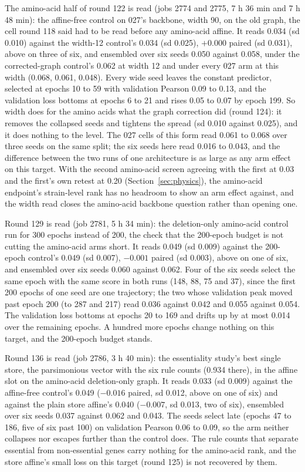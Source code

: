 The amino-acid half of round 122 is read (jobs 2774 and 2775, 7 h 36 min and 7 h 48
min): the affine-free control on 027's backbone, width 90, on the old graph, the cell
round 118 said had to be read before any amino-acid affine. It reads 0.034 (sd 0.010)
against the width-12 control's 0.034 (sd 0.025), $+0.000$ paired (sd 0.031), above on
three of six, and ensembled over six seeds 0.050 against 0.058, under the corrected-graph
control's 0.062 at width 12 and under every 027 arm at this width (0.068, 0.061, 0.048).
Every wide seed leaves the constant predictor, selected at epochs 10 to 59 with
validation Pearson 0.09 to 0.13, and the validation loss bottoms at epochs 6 to 21 and
rises 0.05 to 0.07 by epoch 199. So width does for the amino acids what the graph
correction did (round 124): it removes the collapsed seeds and tightens the spread (sd
0.010 against 0.025), and it does nothing to the level. The 027 cells of this form read
0.061 to 0.068 over three seeds on the same split; the six seeds here read 0.016 to
0.043, and the difference between the two runs of one architecture is as large as any
arm effect on this target. With the second amino-acid screen agreeing with the first at
0.03 and the first's own retest at 0.20 (Section~\ref{sec:physics}), the
amino-acid endpoint's strain-level rank has no headroom to show an arm effect against,
and the width read closes the amino-acid backbone question rather than opening one.

Round 129 is read (job 2781, 5 h 34 min): the deletion-only amino-acid control run for
300 epochs instead of 200, the check that the 200-epoch budget is not cutting the
amino-acid arms short. It reads 0.049 (sd 0.009) against the 200-epoch control's 0.049
(sd 0.007), $-0.001$ paired (sd 0.003), above on one of six, and ensembled over six
seeds 0.060 against 0.062. Four of the six seeds select the same epoch with the same
score in both runs (148, 88, 75 and 37), since the first 200 epochs of one seed are one
trajectory; the two whose validation peak moved past epoch 200 (to 287 and 217) read
0.036 against 0.042 and 0.055 against 0.054. The validation loss bottoms at epochs 20
to 169 and drifts up by at most 0.014 over the remaining epochs. A hundred more epochs
change nothing on this target, and the 200-epoch budget stands.

Round 136 is read (job 2786, 3 h 40 min): the essentiality study's best single store,
the parsimonious vector with the six rule counts (0.934 there), in the affine slot on
the amino-acid deletion-only graph. It reads 0.033 (sd 0.009) against the affine-free
control's 0.049 ($-0.016$ paired, sd 0.012, above on one of six) and against the plain
store affine's 0.040 ($-0.007$, sd 0.013, two of six), ensembled over six seeds 0.037
against 0.062 and 0.043. The seeds select late (epochs 47 to 186, five of six past
100) on validation Pearson 0.06 to 0.09, so the arm neither collapses nor escapes
further than the control does. The rule counts that separate essential from
non-essential genes carry nothing for the amino-acid rank, and the store affine's small
loss on this target (round 125) is not recovered by them.

